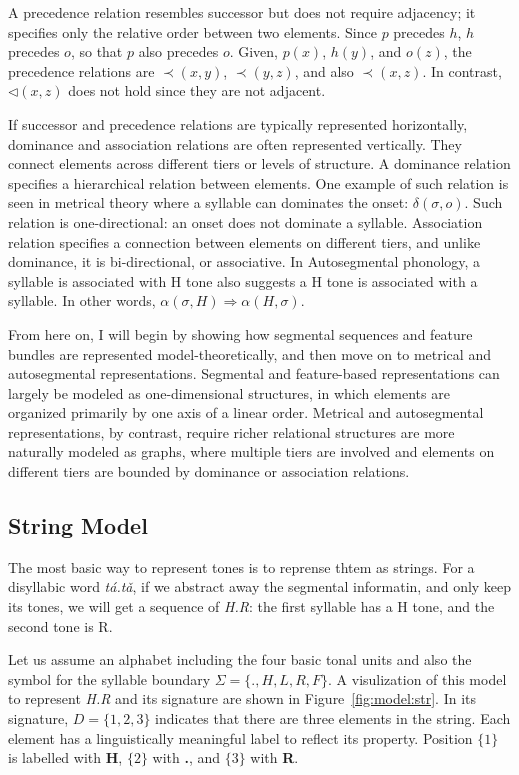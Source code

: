 A precedence relation resembles successor but does not require adjacency; it 
specifies only the relative order between two elements. Since \(p\) precedes 
\(h\), \(h\) precedes \(o\), so that \(p\) also precedes \(o\). Given, \(p(x)\),
\(h(y)\), and \(o(z)\), the precedence relations are \(\prec(x,y)\), \(\prec(y, z)\), 
and also \(\prec(x,z)\). In contrast, \(\lhd(x,z)\) does not hold since they 
are not adjacent.

If successor and precedence relations are typically represented horizontally, 
dominance and association relations are often represented vertically. They 
connect elements across different tiers or levels of structure. A dominance 
relation specifies a hierarchical relation between elements. One example of such
relation is seen in metrical theory where a syllable can dominates the 
onset: \(\delta(\sigma, o)\). Such relation is one-directional: an onset does not dominate a syllable. Association relation specifies a connection between elements on different tiers, and unlike dominance, it is bi-directional, or
associative. In Autosegmental phonology, a syllable is associated with H tone 
also suggests a H tone is associated with a syllable. In other words, \(\alpha(\sigma, H) \Rightarrow \alpha(H, \sigma)\).

From here on, I will begin by showing how segmental sequences and feature
bundles are represented model-theoretically, and then move on to metrical 
and autosegmental representations. Segmental and feature-based representations can largely 
be modeled as one-dimensional structures, in which elements are organized 
primarily by one axis of a linear order. Metrical and autosegmental 
representations, by contrast, require richer relational structures are more 
naturally modeled as graphs, where multiple tiers are involved and elements 
on different tiers are bounded by dominance or association relations.


\subsection{String Model}
\label{sec:prelim.string}
The most basic way to represent tones is to reprense thtem as
strings. For a disyllabic word \textit{tá.tǎ}, if we abstract 
away the segmental informatin, and only keep its tones, we will 
get a sequence of \textit{H.R}: the first syllable has a H tone, 
and the second tone is R. 

Let us assume an alphabet including the four basic tonal units and also 
the symbol for the syllable boundary \(\Sigma = \{., H, L, R, F\}\). 
A visulization of this model to represent \textit{H.R} and its signature 
are shown in Figure~\ref{fig:model:str}. In its signature,
$D = \{1, 2, 3\}$ indicates that there are three elements in the string.
Each element has a linguistically meaningful label to reflect its  
property.  Position $\{1\}$ is labelled with \textbf{H}, $\{2\}$ with  
\textbf{.}, and $\{3\}$ with \textbf{R}. 

